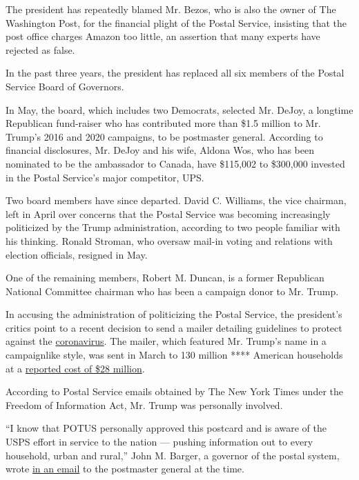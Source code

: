 The president has repeatedly blamed Mr. Bezos, who is also the owner of
The Washington Post, for the financial plight of the Postal Service,
insisting that the post office charges Amazon too little, an assertion
that many experts have rejected as false.

In the past three years, the president has replaced all six members of
the Postal Service Board of Governors.

In May, the board, which includes two Democrats, selected Mr. DeJoy, a
longtime Republican fund-raiser who has contributed more than \$1.5
million to Mr. Trump's 2016 and 2020 campaigns, to be postmaster
general. According to financial disclosures, Mr. DeJoy and his wife,
Aldona Wos, who has been nominated to be the ambassador to Canada, have
\$115,002 to \$300,000 invested in the Postal Service's major
competitor, UPS.

Two board members have since departed. David C. Williams, the vice
chairman, left in April over concerns that the Postal Service was
becoming increasingly politicized by the Trump administration, according
to two people familiar with his thinking. Ronald Stroman, who oversaw
mail-in voting and relations with election officials, resigned in May.

One of the remaining members, Robert M. Duncan, is a former Republican
National Committee chairman who has been a campaign donor to Mr. Trump.

In accusing the administration of politicizing the Postal Service, the
president's critics point to a recent decision to send a mailer
detailing guidelines to protect against the
\href{https://www.nytimes.com/interactive/2020/us/coronavirus-us-cases.htmlhttps://www.nytimes.com/interactive/2020/us/coronavirus-us-cases.html}{coronavirus}.
The mailer, which featured Mr. Trump's name in a campaignlike style, was
sent in March to 130 million **** American households at a
\href{https://www.usatoday.com/story/news/politics/2020/05/28/coronavirus-post-card-trump-cost-post-office-28-million/5274034002/}{reported
cost of \$28 million}.

According to Postal Service emails obtained by The New York Times under
the Freedom of Information Act, Mr. Trump was personally involved.

``I know that POTUS personally approved this postcard and is aware of
the USPS effort in service to the nation --- pushing information out to
every household, urban and rural,'' John M. Barger, a governor of the
postal system, wrote
\href{https://www.documentcloud.org/documents/7010858-USPS-Email-Trump-Personally-Approved-28M.html}{in
an email} to the postmaster general at the time.


